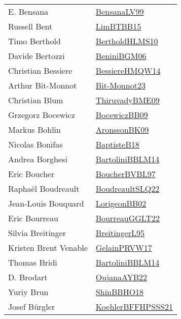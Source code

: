 {\begin{longtable}{p{4cm}p{20cm}}
E. Bensana & \href{articles/BensanaLV99.pdf}{BensanaLV99}\cite{BensanaLV99} \\
Russell Bent & \href{papers/LimBTBB15.pdf}{LimBTBB15}\cite{LimBTBB15} \\
Timo Berthold & \href{papers/BertholdHLMS10.pdf}{BertholdHLMS10}\cite{BertholdHLMS10} \\
Davide Bertozzi & \href{papers/BeniniBGM06.pdf}{BeniniBGM06}\cite{BeniniBGM06} \\
Christian Bessiere & \href{papers/BessiereHMQW14.pdf}{BessiereHMQW14}\cite{BessiereHMQW14} \\
Arthur Bit{-}Monnot & \href{papers/Bit-Monnot23.pdf}{Bit-Monnot23}\cite{Bit-Monnot23} \\
Christian Blum & \href{papers/ThiruvadyBME09.pdf}{ThiruvadyBME09}\cite{ThiruvadyBME09} \\
Grzegorz Bocewicz & \href{articles/BocewiczBB09.pdf}{BocewiczBB09}\cite{BocewiczBB09} \\
Markus Bohlin & \href{papers/AronssonBK09.pdf}{AronssonBK09}\cite{AronssonBK09} \\
Nicolas Bonifas & \href{articles/BaptisteB18.pdf}{BaptisteB18}\cite{BaptisteB18} \\
Andrea Borghesi & \href{papers/BartoliniBBLM14.pdf}{BartoliniBBLM14}\cite{BartoliniBBLM14} \\
Eric Boucher & \href{papers/BoucherBVBL97.pdf}{BoucherBVBL97}\cite{BoucherBVBL97} \\
Rapha{\"{e}}l Boudreault & \href{papers/BoudreaultSLQ22.pdf}{BoudreaultSLQ22}\cite{BoudreaultSLQ22} \\
Jean{-}Louis Bouquard & \href{articles/LorigeonBB02.pdf}{LorigeonBB02}\cite{LorigeonBB02} \\
Eric Bourreau & \href{articles/BourreauGGLT22.pdf}{BourreauGGLT22}\cite{BourreauGGLT22} \\
Silvia Breitinger & \href{}{BreitingerL95}\cite{BreitingerL95} \\
Kristen Brent Venable & \href{papers/GelainPRVW17.pdf}{GelainPRVW17}\cite{GelainPRVW17} \\
Thomas Bridi & \href{papers/BartoliniBBLM14.pdf}{BartoliniBBLM14}\cite{BartoliniBBLM14} \\
D. Brodart & \href{papers/OujanaAYB22.pdf}{OujanaAYB22}\cite{OujanaAYB22} \\
Yuriy Brun & \href{articles/ShinBBHO18.pdf}{ShinBBHO18}\cite{ShinBBHO18} \\
Josef B{\"{u}}rgler & \href{articles/KoehlerBFFHPSSS21.pdf}{KoehlerBFFHPSSS21}\cite{KoehlerBFFHPSSS21} \\

\end{longtable}}
